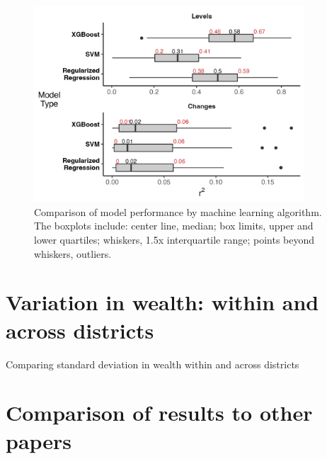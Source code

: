 \documentclass{article}
\begin{document}
\begin{figure}[H]
    \centering
    \includegraphics[width=0.9\textwidth]{figures/ml_results_type.png}
    \caption{Comparison of model performance by machine learning algorithm. The boxplots include: center line, median; box limits, upper and lower quartiles; whiskers, 1.5x interquartile range; points beyond whiskers, outliers.}
     \label{fig:ml_results_type}
\end{figure}

\newpage
\section{Variation in wealth: within and across districts}\label{si:within_across_pca_sd}

\singlespacing
\begin{table}[H]
\small
\caption{Comparing standard deviation in wealth within and across districts}
\label{tab:within_across_pca_sd}
\centering

\end{table}
\normalsize
\doublespacing

\newpage

\section{Comparison of results to other papers}
\label{si:compare_other_papers}
\end{document}
